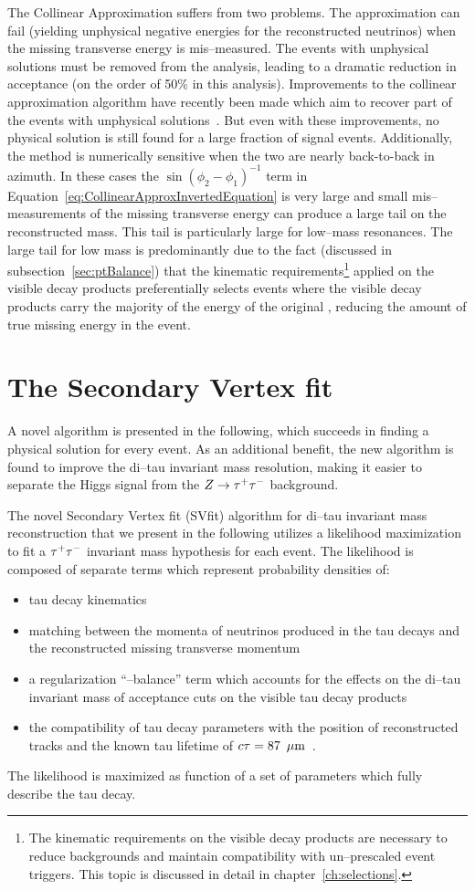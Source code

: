 The Collinear Approximation suffers from two problems.  The approximation can
fail (yielding unphysical negative energies for the reconstructed neutrinos)
when the missing transverse energy is mis--measured.  The events with unphysical
solutions must be removed from the analysis, leading to a dramatic reduction in
acceptance (on the order of 50\% in this analysis).  Improvements to the
collinear approximation algorithm have recently been made which aim to recover
part of the events with unphysical solutions~\cite{improvedCollinearApprox}.
But even with these improvements, no physical solution is still found for a
large fraction of signal events.  Additionally, the method is numerically
sensitive when the two \taul are nearly back-to-back in azimuth.  In these cases
the $\sin(\phi_2 - \phi_1)^{-1}$ term in
Equation~\ref{eq:CollinearApproxInvertedEquation} is very large and small
mis--measurements of the missing transverse energy can produce a large tail on
the reconstructed mass.  This tail is particularly large for low--mass
resonances.  The large tail for low mass is predominantly due to the fact
(discussed in subsection~\ref{sec:ptBalance}) that the kinematic
requirements\footnote{The kinematic requirements on the visible decay products
are necessary to reduce backgrounds and maintain compatibility with
un--prescaled event triggers.  This topic is discussed in detail in
chapter~\ref{ch:selections}.} applied on the visible decay products
preferentially selects events where the visible decay products carry the
majority of the energy of the original \taul, reducing the amount of true
missing energy in the event.  

\section{The Secondary Vertex fit}
A novel algorithm is presented in the following, which succeeds in finding a
physical solution for every event.  As an additional benefit, the new algorithm
is found to improve the di--tau invariant mass resolution, making it easier to
separate the Higgs signal from the $Z\to\tau^+\tau^-$ background.

The novel Secondary Vertex fit (SVfit) algorithm for di--tau invariant mass
reconstruction that we present in the following utilizes a likelihood
maximization to fit a $\tau^+\tau^-$ invariant mass hypothesis for each
event.  The likelihood is composed of separate terms which represent probability
densities of:
\begin{itemize}
\item tau decay kinematics
\item matching between the momenta of neutrinos produced in the tau decays and
  the reconstructed missing transverse momentum
\item a regularization ``\pt--balance'' term which accounts for the effects on the di--tau invariant mass
 of acceptance cuts on the visible tau decay products
\item the compatibility of tau decay parameters with the position of reconstructed tracks
 and the known tau lifetime of $c\tau = 87~\,\mu\text{m}$~\cite{PDG}.
\end{itemize}
The likelihood is maximized as function of a set of parameters which fully describe the tau decay.

